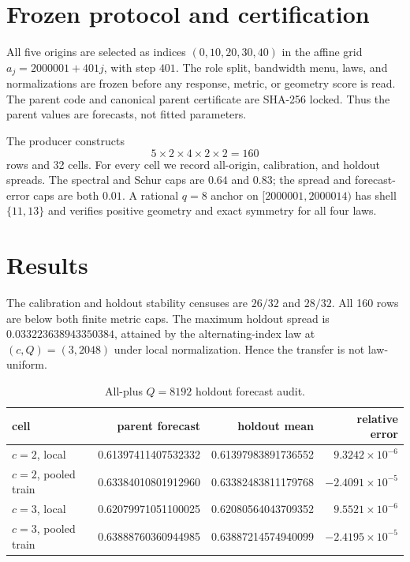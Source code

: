 \documentclass[10pt]{article}
\begin{document}
\section{Frozen protocol and certification}

All five origins are selected as indices $(0,10,20,30,40)$ in the affine grid
$a_j=2000001+401j$, with step $401$.  The role split, bandwidth menu, laws,
and normalizations are frozen before any response, metric, or geometry score
is read.  The parent code and canonical parent certificate are SHA-256
locked.  Thus the parent values are forecasts, not fitted parameters.

The producer constructs
\[
5\times2\times4\times2\times2=160
\]
rows and 32 cells.  For every cell we record all-origin, calibration, and
holdout spreads.  The spectral and Schur caps are $0.64$ and $0.83$; the
spread and forecast-error caps are both $0.01$.  A rational $q=8$ anchor on
$[2000001,2000014)$ has shell $\{11,13\}$ and verifies positive geometry and
exact symmetry for all four laws.

\section{Results}

The calibration and holdout stability censuses are $26/32$ and $28/32$.
All 160 rows are below both finite metric caps.  The maximum holdout spread is
$0.033223638943350384$, attained by the alternating-index law at
$(c,Q)=(3,2048)$ under local normalization.  Hence the transfer is not
law-uniform.

\begin{table}[h]
\centering
\small
\caption{All-plus $Q=8192$ holdout forecast audit.}
\begin{tabular}{@{}lrrr@{}}
\toprule
cell & parent forecast & holdout mean & relative error\\
\midrule
$c=2$, local & 0.61397411407532332 & 0.61397983891736552 & $9.3242\times10^{-6}$\\
$c=2$, pooled train & 0.63384010801912960 & 0.63382483811179768 & $-2.4091\times10^{-5}$\\
$c=3$, local & 0.62079971051100025 & 0.62080564043709352 & $9.5521\times10^{-6}$\\
$c=3$, pooled train & 0.63888760360944985 & 0.63887214574940099 & $-2.4195\times10^{-5}$\\
\bottomrule
\end{tabular}
\end{table}
\end{document}
